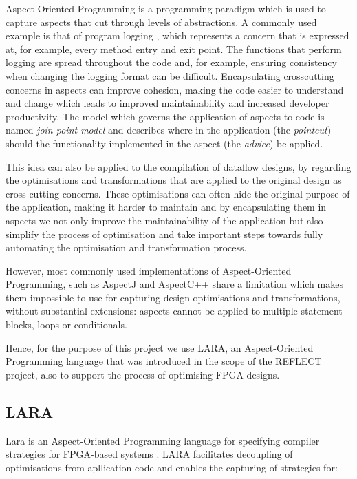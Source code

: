 Aspect-Oriented Programming \cite{Kiczales:2005:AP:1062455.1062640} is
a programming paradigm which is used to capture aspects that cut
through levels of abstractions. A commonly used example is that of
program logging \cite{jacobson2004aspect}, which represents a concern
that is expressed at, for example, every method entry and exit
point. The functions that perform logging are spread throughout the
code and, for example, ensuring consistency when changing the logging
format can be difficult. Encapsulating crosscutting concerns in
aspects can improve cohesion, making the code easier to understand and
change which leads to improved maintainability and increased developer
productivity. The model which governs the application of aspects to
code is named \emph{join-point model} and describes where in the
application (the \emph{pointcut}) should the functionality implemented
in the aspect (the \emph{advice}) be applied.

This idea can also be applied to the compilation of dataflow designs,
by regarding the optimisations and transformations that are applied to
the original design as cross-cutting concerns. These optimisations can
often hide the original purpose of the application, making it harder
to maintain and by encapsulating them in aspects we not only improve
the maintainability of the application but also simplify the process
of optimisation and take important steps towards fully automating the
optimisation and transformation process.

However, most commonly used implementations of Aspect-Oriented
Programming, such as AspectJ \cite{Gradecki:Lesiecki:2003,
  Kiczales:2001} and AspectC++\cite{Spinczyk:Gal:Schroder:2002} share
a limitation which makes them impossible to use for capturing design
optimisations and transformations, without substantial extensions:
aspects cannot be applied to multiple statement blocks, loops or
conditionals.

Hence, for the purpose of this project we use LARA, an Aspect-Oriented
Programming language that was introduced in the scope of the
REFLECT\cite{Cardoso:Bertels:Kuzmanov:Nane:Sima:2011} project, also to
support the process of optimising FPGA designs.

\subsection{LARA}

Lara is an Aspect-Oriented Programming language for specifying
compiler strategies for FPGA-based systems
\cite{Cardoso:Teixeira:Alves:Nobre:Diniz:Cutinho:Luk:2012}. LARA
facilitates decoupling of optimisations from apllication code and
enables the capturing of strategies for:

